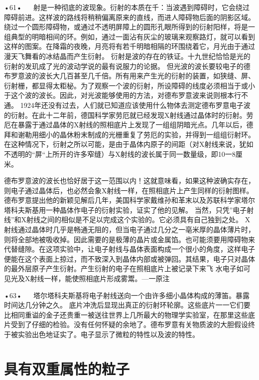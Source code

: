 •61•
  
射是一种彻底的波现象。衍射的本质在千：当波遇到障碍时，它会绕过障碍前进。这样波的路线将稍稍偏离原来的直线，而进人障碍物后面的阴影区域。
绕过一个圆形障碍物，或通过不透明屏障上的圆形孔眼所得到的衍射阳样，将是一组典型的明暗相间的环。例如，通过一面沾有灰尘的玻璃来观察路灯，就可以看到这样的图案。在降霜的夜晚，月亮将有若千明暗相隔的环围绕着它，月光由于通过漫天飞舞看的冰结晶而产生衍射。
衍射是波的存在的铁证。十九世纪恰恰是光的衍射的发玑成了光的波动学说的最有说服力的论据。
但光波的波长要较电子的德布罗意波的波长大几百甚至几千倍。所有用来产生光的衍射的装置，如狭缝、屏、衍射栅，都显得太粔柲。为了观察一个波的衍射，所设障碍的线度必须相当于或小于这个波的波长。因此，对光波能够使用的方法，对德布罗意波来说则根本行不通。
1924年还没有过去，人们就已知道应该使用什么物体去测定德布罗意电子波的衍射。在此十二年前，德国科学家劳厄就已经发现X射线通过晶体时的衍射。劳厄在暴露于通过晶体的X射线的照相底片上发现了一组组阴暗光点。几年以后，德拜和谢勒用细小的晶休粉末制成的光栅重复了劳厄的实验，并得到一组组衍射环。在这种情况下，衍射之所以可能，是由于晶体内原子的间距（对X射线来说，犹如不透明的“屏“上所开的许多窄缝）与X射线的波长属于同一数量级，即10一8厘米。

德布罗意波的波长也恰好居于这一范围以内！这就意味看，如果这种波确实存在，则电子通过晶体后，也必然会象X射线一样，在照相底片上产生同样的衍射图样。
德布罗意提出他的新颖见解后几年，美国科学家戴维孙和革末以及苏联科学家塔尔塔科夫斯基用一种晶体作电子的衍射实验，证实了他的见解。
当然，只凭”电子射线”和X射线之间的相似是不足以完成这个实验的。它必须具有自己独到之处。
X射线通过晶体时几乎是畅通无阻的，但当电子通过几分之一亳米厚的晶体薄片时，则将全部地被吸收掉。因此需要的是极薄的晶片或金属馅。也可能须要用障碍物来代替缝隙。在这项实验中，让电子射线与晶体表面构成一个很小的角度，这样电子便能在这个表面上掠过，而不致深入到晶体内部或被弹回。其结果，电子只对晶体的最外层原子产生衍射。产生衍射的电子在照相底片上被记录下来飞
水电子如可见光及X射线一样，能使照相底片形成雾鬻。—一原注

•63•
  
塔尔塔科夫斯基将电子射线送向一个由许多细小晶体构成的薄笛。暴露时间达几分钟之久。
底片冲洗后显现出真正的衍射环轮廓。这些底片一一它们要比相同重谥的金子还贵重一被送往世界上几所最大的物理学实验室，在那里这些底片受到了仔细的检验。没有任何怀疑的余地了。德布罗意有关物质波的大胆假设终于被实验出色地证实了。电子显示了微粒的特性以及波的特性。

\section{具有双重属性的粒子}

